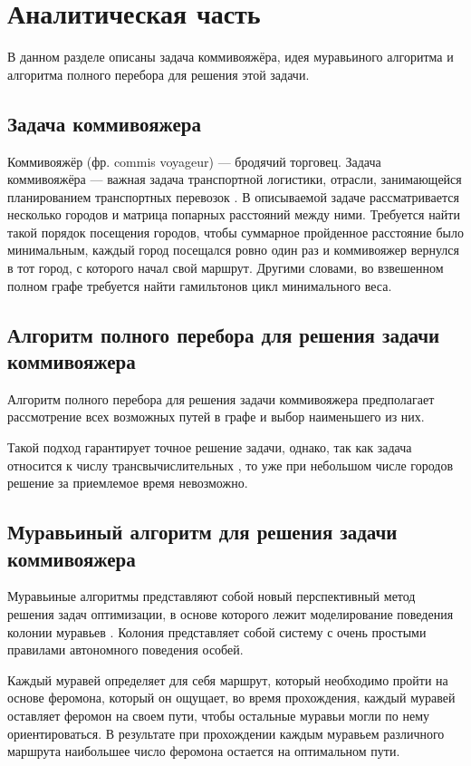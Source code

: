 \documentclass[12pt]{report}
\begin{document}
\chapter{Аналитическая часть}
В данном разделе описаны задача коммивояжёра, идея муравьиного алгоритма и алгоритма полного перебора для решения этой задачи.

\section{Задача коммивояжера}
Коммивояжёр (фр. commis voyageur) — бродячий торговец. Задача коммивояжёра — важная задача транспортной логистики, отрасли, занимающейся планированием транспортных перевозок \cite{Commie}. В описываемой задаче рассматривается несколько городов  и матрица попарных расстояний между ними. Требуется найти такой порядок  посещения  городов,  чтобы  суммарное  пройденное  расстояние было минимальным, каждый город посещался ровно один раз и  коммивояжер  вернулся  в  тот  город,  с  которого  начал  свой  маршрут.  Другими  словами,  во  взвешенном  полном  графе  требуется 
найти гамильтонов цикл минимального веса.

\section{Алгоритм полного перебора для решения задачи коммивояжера}
Алгоритм полного перебора для решения задачи коммивояжера предполагает рассмотрение всех возможных путей в графе и выбор наименьшего из них.

Такой подход гарантирует точное решение задачи, однако, так как задача относится к числу трансвычислительных \cite{Trans}, то уже при небольшом числе городов решение за приемлемое время невозможно.

\section{Муравьиный алгоритм для решения задачи коммивояжера}
Муравьиные алгоритмы представляют собой новый перспективный метод решения задач оптимизации, в основе которого лежит моделирование поведения колонии муравьев \cite{Ulianov}. Колония представляет собой систему с очень простыми правилами автономного поведения особей.

Каждый муравей определяет для себя маршрут, который необходимо пройти на основе феромона, который он ощущает, во время прохождения, каждый муравей оставляет феромон на своем пути, чтобы остальные муравьи могли по нему ориентироваться. В результате при прохождении каждым муравьем различного маршрута наибольшее число феромона остается на оптимальном пути. 
\end{document}
